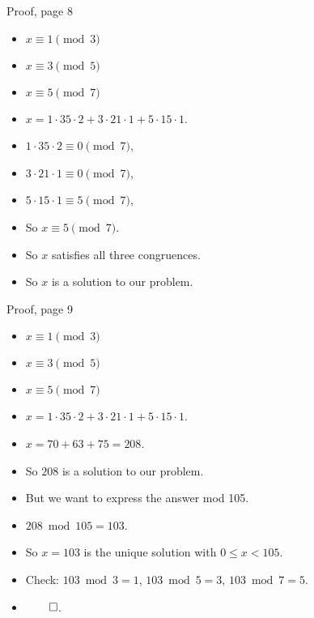\documentclass[handout]{beamer}
\begin{document}
\begin{frame}{Proof, page 8}

\begin{itemize}
  \item $x \equiv 1 \pmod 3$
  \item $x \equiv 3 \pmod 5$
  \item $x \equiv 5 \pmod 7$
  \item $x = 1 \cdot 35 \cdot 2 + 3 \cdot 21 \cdot 1 + 5 \cdot 15 \cdot 1$.
  \item $1 \cdot 35 \cdot 2 \equiv 0 \pmod 7$,
  \item $3 \cdot 21 \cdot 1 \equiv 0 \pmod 7$,
  \item $5 \cdot 15 \cdot 1 \equiv 5 \pmod 7$,
  \item So $x \equiv 5 \pmod 7$.
  \item So $x$ satisfies all three congruences.
  \item So $x$ is a solution to our problem.
\end{itemize}

\end{frame}

\begin{frame}{Proof, page 9}

\begin{itemize}
  \item $x \equiv 1 \pmod 3$
  \item $x \equiv 3 \pmod 5$
  \item $x \equiv 5 \pmod 7$
  \item $x = 1 \cdot 35 \cdot 2 + 3 \cdot 21 \cdot 1 + 5 \cdot 15 \cdot 1$.
  \item $x = 70 + 63 + 75 = 208$.
  \item So $208$ is a solution to our problem.
  \item But we want to express the answer mod 105.
  \item $208 \bmod 105 = 103$.
  \item So $x=103$ is the unique solution with $0\leq x < 105$.
  \item Check: $103 \bmod 3 = 1$, $103 \bmod  5 = 3$, $103\bmod 7 = 5$.
  \item $\qed$.
\end{itemize}

\end{frame}
\end{document}
